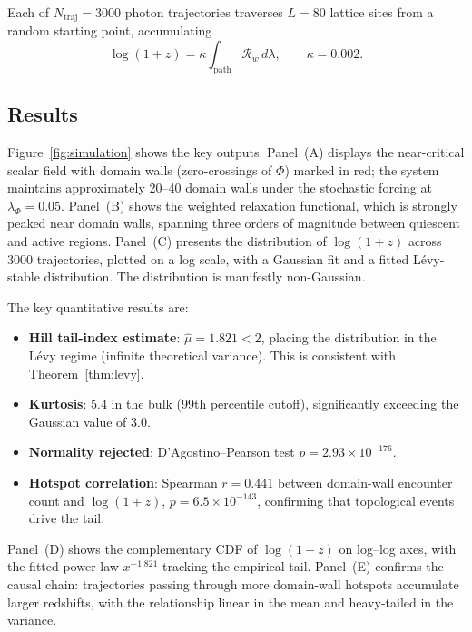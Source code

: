 \documentclass[12pt,a4paper]{article}
\theoremstyle{remark}
\begin{document}
Each of $N_{\mathrm{traj}} = 3000$ photon trajectories traverses $L = 80$
lattice sites from a random starting point, accumulating
\begin{equation}
\log(1+z) = \kappa\int_{\mathrm{path}}\mathcal{R}_w\,d\lambda, \qquad \kappa = 0.002.
\end{equation}

\subsection{Results}

Figure~\ref{fig:simulation} shows the key outputs. Panel~(A) displays the
near-critical scalar field with domain walls (zero-crossings of $\Phi$) marked
in red; the system maintains approximately 20--40 domain walls under the
stochastic forcing at $\lambda_\Phi = 0.05$. Panel~(B) shows the weighted
relaxation functional, which is strongly peaked near domain walls, spanning
three orders of magnitude between quiescent and active regions. Panel~(C)
presents the distribution of $\log(1+z)$ across 3000 trajectories, plotted
on a log scale, with a Gaussian fit and a fitted Lévy-stable distribution.
The distribution is manifestly non-Gaussian.

The key quantitative results are:
\begin{itemize}[leftmargin=2em]
\item \textbf{Hill tail-index estimate}: $\hat{\mu} = 1.821 < 2$, placing the
  distribution in the Lévy regime (infinite theoretical variance). This is
  consistent with Theorem~\ref{thm:levy}.
\item \textbf{Kurtosis}: $5.4$ in the bulk (99th percentile cutoff),
  significantly exceeding the Gaussian value of $3.0$.
\item \textbf{Normality rejected}: D'Agostino--Pearson test $p = 2.93 \times
  10^{-176}$.
\item \textbf{Hotspot correlation}: Spearman $r = 0.441$ between domain-wall
  encounter count and $\log(1+z)$, $p = 6.5 \times 10^{-143}$, confirming
  that topological events drive the tail.
\end{itemize}
Panel~(D) shows the complementary CDF of $\log(1+z)$ on log--log axes, with
the fitted power law $x^{-1.821}$ tracking the empirical tail. Panel~(E)
confirms the causal chain: trajectories passing through more domain-wall
hotspots accumulate larger redshifts, with the relationship linear in the
mean and heavy-tailed in the variance.
\end{document}
